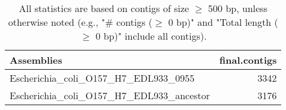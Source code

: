 \documentclass[12pt,a4paper]{article}
\begin{document}
\begin{table}[ht]
\begin{center}
\caption{All statistics are based on contigs of size $\geq$ 500 bp, unless otherwise noted (e.g., "\# contigs ($\geq$ 0 bp)" and "Total length ($\geq$ 0 bp)" include all contigs).}
\begin{tabular}{|l*{1}{|r}|}
\hline
Assemblies & final.contigs \\ \hline
Escherichia\_coli\_O157\_H7\_EDL933\_0955 & 3342 \\ \hline
Escherichia\_coli\_O157\_H7\_EDL933\_ancestor & 3176 \\ \hline
\end{tabular}
\end{center}
\end{table}
\end{document}
